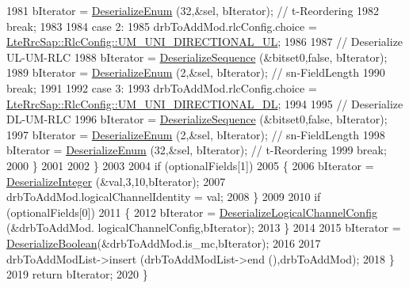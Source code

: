 \begin{DoxyCode}
1981               bIterator = \hyperlink{classns3_1_1Asn1Header_a4fcc253e0eec3483c775b005c1875f2d}{DeserializeEnum} (32,&sel, bIterator); \textcolor{comment}{// t-Reordering}
1982               \textcolor{keywordflow}{break};
1983 
1984             \textcolor{keywordflow}{case} 2:
1985               drbToAddMod.rlcConfig.choice = 
      \hyperlink{structns3_1_1LteRrcSap_1_1RlcConfig_ab6ab94ca4abaf717926f31db4dddc61ba590c05a82e744bfb87986d444da6f4e8}{LteRrcSap::RlcConfig::UM\_UNI\_DIRECTIONAL\_UL};
1986 
1987               \textcolor{comment}{// Deserialize UL-UM-RLC}
1988               bIterator = \hyperlink{classns3_1_1Asn1Header_a58c68bb97ba3fe2e8fcdd7c208d672b2}{DeserializeSequence} (&bitset0,\textcolor{keyword}{false}, bIterator);
1989               bIterator = \hyperlink{classns3_1_1Asn1Header_a4fcc253e0eec3483c775b005c1875f2d}{DeserializeEnum} (2,&sel, bIterator); \textcolor{comment}{// sn-FieldLength}
1990               \textcolor{keywordflow}{break};
1991 
1992             \textcolor{keywordflow}{case} 3:
1993               drbToAddMod.rlcConfig.choice = 
      \hyperlink{structns3_1_1LteRrcSap_1_1RlcConfig_ab6ab94ca4abaf717926f31db4dddc61ba5d389f5f1231591496fe6e143e8f1ddf}{LteRrcSap::RlcConfig::UM\_UNI\_DIRECTIONAL\_DL};
1994 
1995               \textcolor{comment}{// Deserialize DL-UM-RLC}
1996               bIterator = \hyperlink{classns3_1_1Asn1Header_a58c68bb97ba3fe2e8fcdd7c208d672b2}{DeserializeSequence} (&bitset0,\textcolor{keyword}{false}, bIterator);
1997               bIterator = \hyperlink{classns3_1_1Asn1Header_a4fcc253e0eec3483c775b005c1875f2d}{DeserializeEnum} (2,&sel, bIterator); \textcolor{comment}{// sn-FieldLength}
1998               bIterator = \hyperlink{classns3_1_1Asn1Header_a4fcc253e0eec3483c775b005c1875f2d}{DeserializeEnum} (32,&sel, bIterator); \textcolor{comment}{// t-Reordering}
1999               \textcolor{keywordflow}{break};
2000             \}
2001 
2002         \}
2003 
2004       \textcolor{keywordflow}{if} (optionalFields[1])
2005         \{
2006           bIterator = \hyperlink{classns3_1_1Asn1Header_a49802c9af30018b078150e866b6ecae2}{DeserializeInteger} (&val,3,10,bIterator);
2007           drbToAddMod.logicalChannelIdentity = val;
2008         \}
2009 
2010       \textcolor{keywordflow}{if} (optionalFields[0])
2011         \{
2012           bIterator = \hyperlink{classns3_1_1RrcAsn1Header_a2391dd6be784d7a4886d3d70bc8718b4}{DeserializeLogicalChannelConfig} (&drbToAddMod.
      logicalChannelConfig,bIterator);
2013         \}
2014 
2015       bIterator = \hyperlink{classns3_1_1Asn1Header_ab46f4b86988a0fbeb5df11a9bc46222d}{DeserializeBoolean}(&drbToAddMod.is\_mc,bIterator);
2016 
2017       drbToAddModList->insert (drbToAddModList->end (),drbToAddMod);
2018     \}
2019   \textcolor{keywordflow}{return} bIterator;
2020 \}
\end{DoxyCode}


